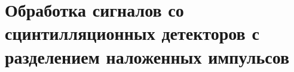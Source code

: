 \chapter{Обработка сигналов со сцинтилляционных детекторов с разделением наложенных импульсов}\label{ch:ch3}

\FloatBarrier

